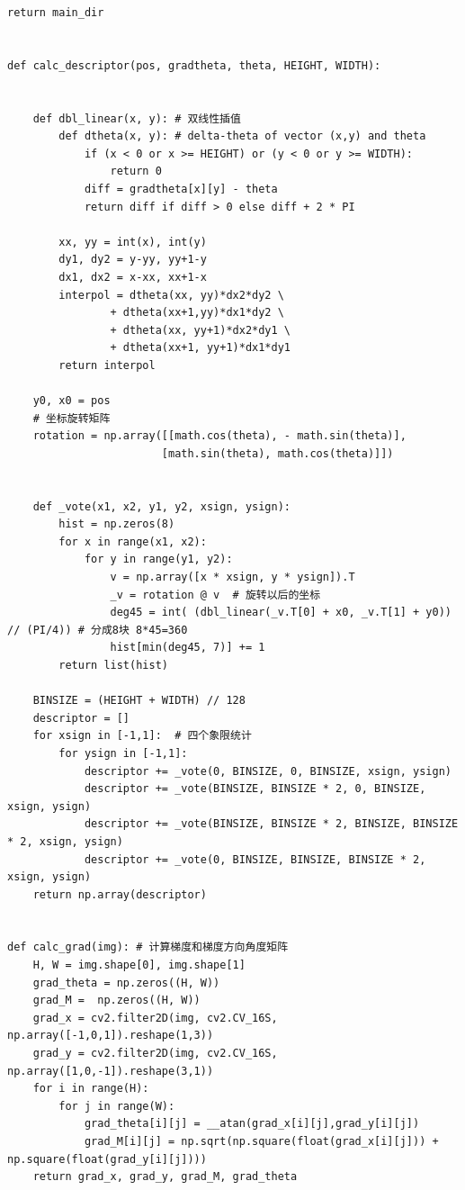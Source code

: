 \documentclass[12pt,a4paper]{article}
\begin{document}
\begin{lstlisting}[style=py]
    return main_dir


def calc_descriptor(pos, gradtheta, theta, HEIGHT, WIDTH):
    
    
    def dbl_linear(x, y): # 双线性插值
        def dtheta(x, y): # delta-theta of vector (x,y) and theta
            if (x < 0 or x >= HEIGHT) or (y < 0 or y >= WIDTH):
                return 0
            diff = gradtheta[x][y] - theta
            return diff if diff > 0 else diff + 2 * PI
        
        xx, yy = int(x), int(y)
        dy1, dy2 = y-yy, yy+1-y
        dx1, dx2 = x-xx, xx+1-x
        interpol = dtheta(xx, yy)*dx2*dy2 \
                + dtheta(xx+1,yy)*dx1*dy2 \
                + dtheta(xx, yy+1)*dx2*dy1 \
                + dtheta(xx+1, yy+1)*dx1*dy1
        return interpol

    y0, x0 = pos
    # 坐标旋转矩阵
    rotation = np.array([[math.cos(theta), - math.sin(theta)],
                        [math.sin(theta), math.cos(theta)]])

    
    def _vote(x1, x2, y1, y2, xsign, ysign):
        hist = np.zeros(8)
        for x in range(x1, x2):
            for y in range(y1, y2):
                v = np.array([x * xsign, y * ysign]).T
                _v = rotation @ v  # 旋转以后的坐标
                deg45 = int( (dbl_linear(_v.T[0] + x0, _v.T[1] + y0)) // (PI/4)) # 分成8块 8*45=360
                hist[min(deg45, 7)] += 1
        return list(hist)

    BINSIZE = (HEIGHT + WIDTH) // 128
    descriptor = []
    for xsign in [-1,1]:  # 四个象限统计
        for ysign in [-1,1]:
            descriptor += _vote(0, BINSIZE, 0, BINSIZE, xsign, ysign)
            descriptor += _vote(BINSIZE, BINSIZE * 2, 0, BINSIZE, xsign, ysign)
            descriptor += _vote(BINSIZE, BINSIZE * 2, BINSIZE, BINSIZE * 2, xsign, ysign)
            descriptor += _vote(0, BINSIZE, BINSIZE, BINSIZE * 2, xsign, ysign)
    return np.array(descriptor)


def calc_grad(img): # 计算梯度和梯度方向角度矩阵
    H, W = img.shape[0], img.shape[1]
    grad_theta = np.zeros((H, W))
    grad_M =  np.zeros((H, W))
    grad_x = cv2.filter2D(img, cv2.CV_16S, np.array([-1,0,1]).reshape(1,3))
    grad_y = cv2.filter2D(img, cv2.CV_16S, np.array([1,0,-1]).reshape(3,1))
    for i in range(H):
        for j in range(W):
            grad_theta[i][j] = __atan(grad_x[i][j],grad_y[i][j])
            grad_M[i][j] = np.sqrt(np.square(float(grad_x[i][j])) + np.square(float(grad_y[i][j])))
    return grad_x, grad_y, grad_M, grad_theta



\end{lstlisting}
\end{document}
